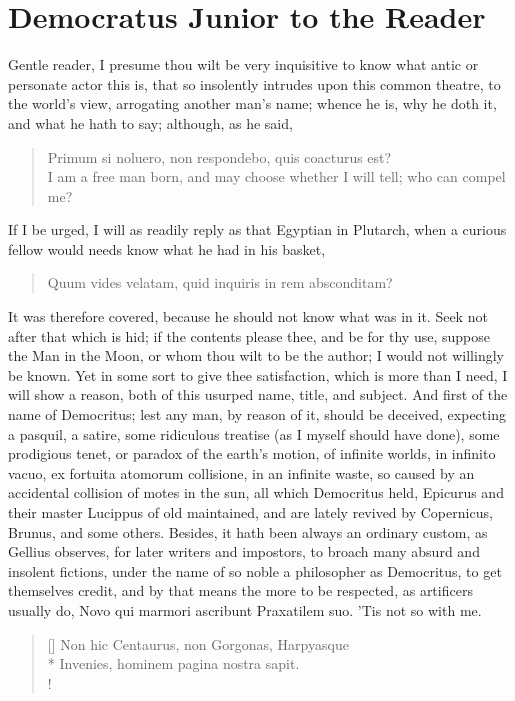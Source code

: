 \chapter{Democratus Junior to the Reader}
{
Gentle reader, I presume thou wilt be very inquisitive to know what
antic or personate actor this is, that so insolently intrudes upon this
common theatre, to the world's view, arrogating another man's name;
whence he is, why he doth it, and what he hath to say; although, as
he said,

\begin{quote}
\textlatin{Primum si noluero, non respondebo, quis coacturus est?}\\
I am a free man born, and may choose whether I will tell; who can compel me?
\end{quote}
If I be urged, I will as readily reply as that Egyptian in Plutarch,
when a curious fellow would needs know what he had in his basket,
\begin{quote}
\textlatin{Quum vides velatam, quid inquiris in rem absconditam?}
\end{quote}
It was therefore covered, because he should not know what was in it. Seek not after that
which is hid; if the contents please thee, and be for thy use,
suppose the Man in the Moon, or whom thou wilt to be the author; I
would not willingly be known. Yet in some sort to give thee
satisfaction, which is more than I need, I will show a reason, both of
this usurped name, title, and subject. And first of the name of
Democritus; lest any man, by reason of it, should be deceived,
expecting a pasquil, a satire, some ridiculous treatise (as I myself
should have done), some prodigious tenet, or paradox of the earth's
motion, of infinite worlds, \textlatin{in infinito vacuo, ex fortuita atomorum
collisione}, in an infinite waste, so caused by an accidental collision
of motes in the sun, all which Democritus held, Epicurus and their
master Lucippus of old maintained, and are lately revived by
Copernicus, Brunus, and some others. Besides, it hath been always an
ordinary custom, as Gellius observes, for later writers and
impostors, to broach many absurd and insolent fictions, under the name
of so noble a philosopher as Democritus, to get themselves credit, and
by that means the more to be respected, as artificers usually do,
\textlatin{Novo qui marmori ascribunt Praxatilem suo}. 'Tis not so with me.
\settowidth{\versewidth}{Non hic Centaurus, non Gorgonas, Harpyasque}
\begin{verse}[\versewidth]
\textlatin{Non hic Centaurus, non Gorgonas, Harpyasque}\\*
\textlatin{Invenies, hominem pagina nostra sapit.}\\!


\end{verse}}
